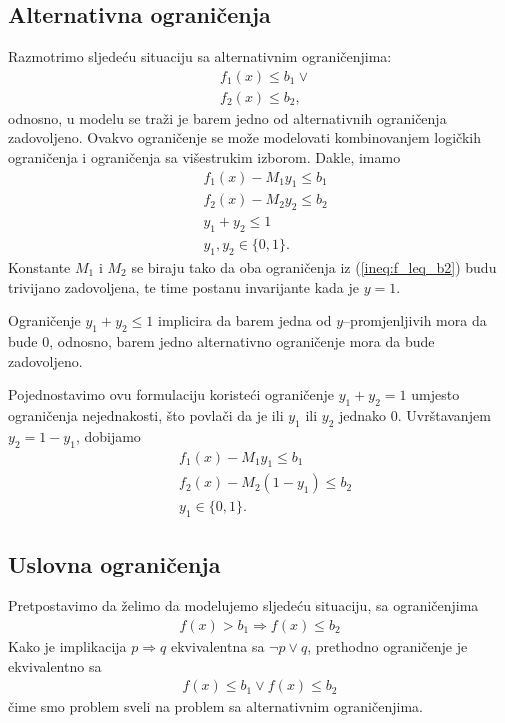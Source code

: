 \documentclass[a4paper, utf8, 11pt, colorlinks]{book}
\theoremstyle{definition}
\begin{document}

\subsection{Alternativna ograničenja} 

Razmotrimo sljedeću situaciju sa alternativnim ograničenjima:
\begin{align}
     &f_1(x) \leq b_1 \vee \nonumber\\
     &f_2(x) \leq b_2,\label{ineq:f_leq_b2}
\end{align}
odnosno, u modelu se traži je barem jedno od alternativnih ograničenja zadovoljeno. 
Ovakvo ograničenje se može modelovati kombinovanjem logičkih ograničenja i ograničenja sa višestrukim izborom. Dakle, imamo 
\begin{align*}
      &f_1(x) - M_1 y_1  \leq b_1 \\
      &f_2(x) - M_2 y_2  \leq b_2 \\
      & y_1 + y_2 \leq 1 \\
      & y_1, y_2 \in \{0, 1\}.
\end{align*}
Konstante $M_1$ i $M_2$ se biraju tako da oba ograničenja iz (\ref{ineq:f_leq_b2})  budu trivijano zadovoljena, te time postanu invarijante kada je $y=1$.

Ograničenje $y_1 + y_2 \leq 1$ implicira da barem jedna od $y$--promjenljivih mora da bude 0, odnosno, barem jedno alternativno ograničenje mora da bude zadovoljeno. 

Pojednostavimo ovu formulaciju koristeći ograničenje $y_1 + y_2 = 1$ umjesto ograničenja nejednakosti, što povlači da je ili $y_1$ ili $y_2$    jednako 0. Uvrštavanjem $y_2 =  1-y_1$,  dobijamo 
\begin{align*}
      & f_1(x) - M_1 y_1       \leq b_1 \\
      & f_2(x) - M_2 (1-y_1)   \leq b_2  \\
      & y_1 \in \{0,1 \}.
\end{align*}

\subsection{Uslovna ograničenja} 
Pretpostavimo da želimo da modelujemo sljedeću situaciju, sa ograničenjima 
\begin{align*}
    f(x) > b_1 \Rightarrow f(x) \leq b_2 
\end{align*}
Kako je implikacija $p \Rightarrow q$ ekvivalentna sa $\neg p \vee q$, prethodno ograničenje je ekvivalentno sa
\begin{align*}
    f(x) \leq b_1 \vee f(x) \leq b_2 
\end{align*}
čime smo problem sveli na problem sa alternativnim ograničenjima. 
\end{document}
